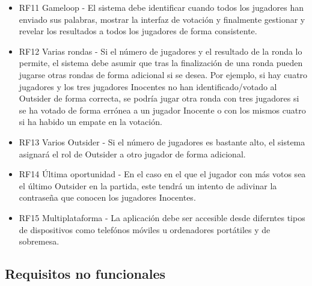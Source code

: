 \begin{itemize}
	\item RF11 Gameloop - El sistema debe identificar cuando todos los jugadores han enviado sus palabras, mostrar la interfaz
	      de votación y finalmente gestionar y revelar los resultados a todos los jugadores de forma consistente.
	\item RF12 Varias rondas - Si el número de jugadores  y el resultado de la ronda lo permite, el sistema debe asumir que tras
	      la finalización de una ronda pueden jugarse otras rondas de forma adicional si se desea. Por ejemplo, si hay cuatro jugadores y los tres jugadores
	      Inocentes no han identificado/votado al Outsider de forma correcta, se podría jugar otra ronda con tres jugadores si se ha votado de forma
	      errónea a un jugador Inocente o con los mismos cuatro si ha habido un empate en la votación.
	\item RF13 Varios Outsider - Si el número de jugadores es bastante alto, el sistema asignará el rol de Outsider a otro jugador de forma adicional.
	\item RF14 Última oportunidad - En el caso en el que el jugador con más votos sea el último Outsider en la partida, este tendrá un intento de
	      adivinar la contraseña que conocen los jugadores Inocentes.
	\item RF15 Multiplataforma - La aplicación debe ser accesible desde diferntes tipos de dispositivos como telefónos móviles u ordenadores portátiles
	      y de sobremesa.
\end{itemize}

\subsection{Requisitos no funcionales}


